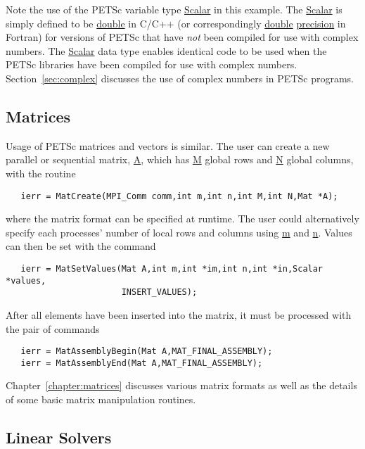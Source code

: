  
Note the use of the PETSc variable type \url{Scalar} in this example.
The \url{Scalar} is simply defined to be \url{double} in C/C++
(or correspondingly \url{double} \url{precision} in Fortran) for versions of
PETSc that have {\em not} been compiled for use with complex numbers.
The \url{Scalar} data type enables
identical code to be used when the PETSc libraries have been compiled
for use with complex numbers.  Section~\ref{sec:complex} discusses the
use of complex numbers in PETSc programs.

\subsection*{Matrices}
\label{sec:matintro}

Usage of PETSc matrices and vectors is similar.  
The user can create a new parallel or sequential matrix, \url{A}, which
has \url{M} global rows and \url{N} global columns, with the routine
\begin{verbatim}
   ierr = MatCreate(MPI_Comm comm,int m,int n,int M,int N,Mat *A);
\end{verbatim}
where the matrix format can be specified at runtime.  The user could
alternatively specify each processes' number of local rows and columns
using \url{m} and \url{n}.
Values can then be set with the command
\begin{verbatim}
   ierr = MatSetValues(Mat A,int m,int *im,int n,int *in,Scalar *values,
                       INSERT_VALUES);
\end{verbatim}
After  all elements have been inserted into the
matrix, it must be processed with the pair of commands
 
\begin{verbatim}
   ierr = MatAssemblyBegin(Mat A,MAT_FINAL_ASSEMBLY);
   ierr = MatAssemblyEnd(Mat A,MAT_FINAL_ASSEMBLY);
\end{verbatim}
Chapter~\ref{chapter:matrices} discusses various matrix formats as
well as the details of some basic matrix manipulation routines.

\subsection*{Linear Solvers}

